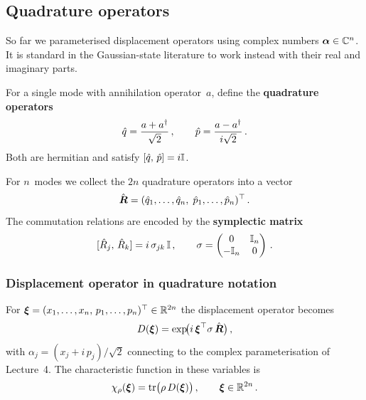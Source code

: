 

\subsection{Quadrature operators}\label{sec:quadratures}

So far we parameterised displacement operators using complex numbers
$\boldsymbol{\alpha} \in \mathbb{C}^n$.  It is standard in the Gaussian-state
literature to work instead with their real and imaginary parts.

\begin{definition}\label{def:quadratures}
  For a single mode with annihilation operator~$a$, define the
  \textbf{quadrature operators}
  \begin{equation}\label{eq:quadratures}
    \hat{q} = \frac{a + a^\dagger}{\sqrt{2}}\,,\qquad
    \hat{p} = \frac{a - a^\dagger}{i\sqrt{2}}\,.
  \end{equation}
  Both are hermitian and satisfy $[\hat{q},\, \hat{p}] = i\mathbb{I}$.
\end{definition}

For $n$~modes we collect the $2n$ quadrature operators into a vector
\begin{equation}\label{eq:R-vector}
  \hat{\boldsymbol{R}}
  = (\hat{q}_1, \ldots, \hat{q}_n,\;
     \hat{p}_1, \ldots, \hat{p}_n)^\top\,.
\end{equation}
The commutation relations are encoded by the \textbf{symplectic matrix}
\begin{equation}\label{eq:symplectic-matrix}
  [\hat{R}_j,\, \hat{R}_k] = i\,\sigma_{jk}\,\mathbb{I}\,,\qquad
  \sigma = \begin{pmatrix} 0 & \mathbb{I}_n \\ -\mathbb{I}_n & 0 \end{pmatrix}\,.
\end{equation}

\subsubsection{Displacement operator in quadrature notation}

For $\boldsymbol{\xi} = (x_1,\ldots,x_n,\, p_1,\ldots,p_n)^\top \in \mathbb{R}^{2n}$
the displacement operator becomes
\begin{equation}\label{eq:displacement-xi}
  D(\boldsymbol{\xi})
  = \exp\!\bigl(i\,\boldsymbol{\xi}^\top \sigma\, \hat{\boldsymbol{R}}\bigr)\,,
\end{equation}
with $\alpha_j = (x_j + i\,p_j)/\sqrt{2}$ connecting to the complex
parameterisation of Lecture~4.  The characteristic function in these
variables is
\begin{equation}\label{eq:char-fn-xi}
  \chi_\rho(\boldsymbol{\xi})
  = \operatorname{tr}\bigl(\rho\, D(\boldsymbol{\xi})\bigr)\,,\qquad
  \boldsymbol{\xi} \in \mathbb{R}^{2n}\,.
\end{equation}

